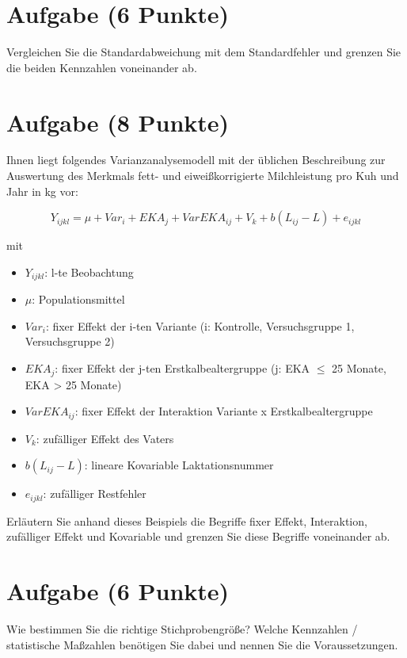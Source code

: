\documentclass[a4paper, 9pt]{scrartcl}\usepackage[]{graphicx}\usepackage[]{xcolor}
\begin{document}
\section{Aufgabe \hfill (6 Punkte)}
Vergleichen Sie die Standardabweichung mit dem Standardfehler und grenzen
Sie die beiden Kennzahlen voneinander ab.



\section{Aufgabe \hfill (8 Punkte)}
Ihnen liegt folgendes Varianzanalysemodell mit der {\"u}blichen Beschreibung
zur Auswertung des Merkmals fett- und eiwei{\ss}korrigierte Milchleistung pro
Kuh und Jahr in kg vor:

\begin{equation*}
  Y_{ijkl} = \mu + Var_i + EKA_j + VarEKA_{ij} + V_k + b(L_{ij} - L) + e_{ijkl}
\end{equation*}

mit

\begin{itemize}
\item $Y_{ijkl}$: l-te Beobachtung
\item $\mu$: Populationsmittel 
\item $Var_i$: fixer Effekt der i-ten Variante (i: Kontrolle,
  Versuchsgruppe 1, Versuchsgruppe 2)
\item $EKA_j$: fixer Effekt der j-ten Erstkalbealtergruppe (j: EKA $\leq$ 25
  Monate, EKA > 25 Monate)
\item $VarEKA_{ij}$: fixer Effekt der Interaktion Variante x
  Erstkalbealtergruppe 
\item $V_k$: zuf{\"a}lliger Effekt des Vaters 
\item $b(L_{ij} - L)$: lineare Kovariable Laktationsnummer 
\item $e_{ijkl}$: zuf{\"a}lliger
  Restfehler
\end{itemize}
Erl{\"a}utern Sie anhand dieses Beispiels die Begriffe fixer Effekt,
Interaktion, zuf{\"a}lliger Effekt und Kovariable und grenzen Sie diese
Begriffe voneinander ab.



\section{Aufgabe \hfill (6 Punkte)}
Wie bestimmen Sie die richtige Stichprobengr{\"o}{\ss}e? Welche Kennzahlen /
statistische Ma{\ss}zahlen ben{\"o}tigen Sie dabei und nennen Sie die
Voraussetzungen.

 
\end{document}
